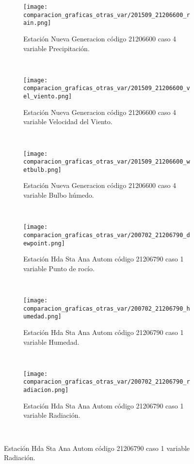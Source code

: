 \begin{figure}[H]
\centering
\begin{subfigure}[normla]{0.4\textwidth}
\caption{Estación Nueva Generacion código 21206600 caso 4 variable Precipitación.}
\texttt{[image: comparacion\_graficas\_otras\_var/201509\_21206600\_rain.png]}
\end{subfigure}
~
\begin{subfigure}[normla]{0.4\textwidth}
\caption{Estación Nueva Generacion código 21206600 caso 4 variable Velocidad del Viento.}
\texttt{[image: comparacion\_graficas\_otras\_var/201509\_21206600\_vel\_viento.png]}
\end{subfigure}
~
\begin{subfigure}[normla]{0.4\textwidth}
\caption{Estación Nueva Generacion código 21206600 caso 4 variable Bulbo húmedo.}
\texttt{[image: comparacion\_graficas\_otras\_var/201509\_21206600\_wetbulb.png]}
\end{subfigure}
~
\begin{subfigure}[normla]{0.4\textwidth}
\caption{Estación Hda Sta Ana Autom código 21206790 caso 1 variable Punto de rocío.}
\texttt{[image: comparacion\_graficas\_otras\_var/200702\_21206790\_dewpoint.png]}
\end{subfigure}
~
\begin{subfigure}[normla]{0.4\textwidth}
\caption{Estación Hda Sta Ana Autom código 21206790 caso 1 variable Humedad.}
\texttt{[image: comparacion\_graficas\_otras\_var/200702\_21206790\_humedad.png]}
\end{subfigure}
~
\begin{subfigure}[normla]{0.4\textwidth}
\caption{Estación Hda Sta Ana Autom código 21206790 caso 1 variable Radiación.}
\texttt{[image: comparacion\_graficas\_otras\_var/200702\_21206790\_radiacion.png]}
\end{subfigure}
~
\end{figure}
           
